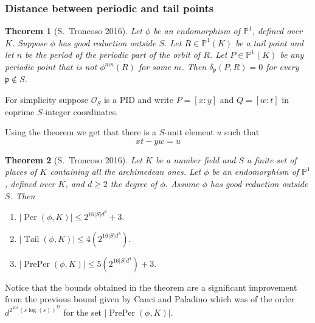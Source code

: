 \documentclass{beamer}
\def\PP{{\mathbb P}}
\def\pp{{\mathfrak p}}
\DeclareMathOperator{\Tail}{Tail}
\DeclareMathOperator{\Per}{Per}
\DeclareMathOperator{\PrePer}{PrePer}
\theoremstyle{thmstyle}
\theoremstyle{thmstyle}
\newtheorem*{mythm}{Theorem}
\theoremstyle{mystyle}
\theoremstyle{qstnstyle}
\begin{document}
\begin{frame}
\frametitle{Distance between periodic and tail points}
\begin{mythm}[S.\ Troncoso 2016]
Let $\phi$ be an endomorphism of $\PP^1$, defined over $K$. Suppose $\phi$ has good reduction outside $S$. Let $R\in\PP^1(K)$ be a tail point and let $n$ be the period of the periodic part of the orbit of $R$. Let $P\in\PP^1(K)$ be any periodic point that is not $\phi^{mn}(R)$ for some $m$. Then $\delta_\pp(P,R)=0$ for every $\pp \notin S$.
\end{mythm}

For simplicity suppose $\mathcal{O}_S$ is a PID and write $P=[x:y]$ and $Q=[w:t]$ in coprime $S$-integer coordinates.

  Using the theorem we get that there is a $S$-unit element $u$ such that
$$xt-yw=u $$
\end{frame}

\begin{frame}
\begin{mythm}[S.\ Troncoso 2016]
Let $K$ be a number field and $S$ a finite set of places of $K$ containing all the archimedean ones. Let $\phi $ be an endomorphism of $\PP^1$, defined over $K$, and $d \geq 2$ the degree of $\phi$. Assume $\phi$ has  good reduction outside $S$. Then
\begin{enumerate}
\item [(a)] $|\Per(\phi,K)| \leq  2^{16|S|d^3}+3.$

\item [(b)] $|\Tail(\phi,K)| \leq  4(2^{16|S|d^3}) .$

\item [(c)] $|\PrePer(\phi,K)| \leq 5(2^{16|S|d^3})+3.$

\end{enumerate}
\end{mythm}

Notice that the bounds obtained  in the theorem are a significant improvement from the previous bound given by Canci and Paladino which was of the order $\displaystyle d^{2^{16s}\left( s\log(s) \right)^{D}}$ for the set $|\PrePer(\phi,K)|$.

\end{frame}

%
%
%
%
\end{document}
